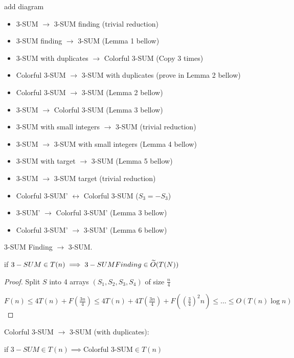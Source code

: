 {\color{red} add diagram}

\begin{itemize}
	\item 3-SUM $\to$ 3-SUM finding (trivial reduction)
	\item 3-SUM finding $\to$ 3-SUM (Lemma 1 bellow)
			
	\item 3-SUM with duplicates $\to$ Colorful 3-SUM (Copy 3 times)
	\item Colorful 3-SUM $\to$ 3-SUM with duplicates (prove in Lemma 2 bellow)

	\item Colorful 3-SUM $\to$ 3-SUM (Lemma 2 bellow)
	\item 3-SUM $\to$ Colorful 3-SUM (Lemma 3 bellow)

	\item 3-SUM with small integers $\to$ 3-SUM (trivial reduction)
	\item 3-SUM $\to$ 3-SUM with small integers (Lemma 4 bellow)

	\item 3-SUM with target $\to$ 3-SUM (Lemma 5 bellow)
	\item 3-SUM $\to$ 3-SUM target (trivial reduction)

	\item Colorful 3-SUM' $\longleftrightarrow$ Colorful 3-SUM ($S_3 = -S_3$)

	\item 3-SUM' $\to$ Colorful 3-SUM' (Lemma 3 bellow)
	\item Colorful 3-SUM' $\to$ 3-SUM' (Lemma 6 bellow)
\end{itemize}

\begin{lm}
	3-SUM Finding $\to$ 3-SUM.

	if $3-SUM \in T(n) \implies 3-SUM Finding \in \widetilde{O}(T(N))$ 
\end{lm}

\begin{proof}
	Split $S $ into 4 arrays $(S_1, S_2, S_3, S_4)$  of size $\frac{n}{4}$ 
	
	$F(n) \le 4 T(n) + F(\frac{3n}{4}) \le 4 T(n) + 4T(\frac{3n}{4}) + F((\frac{3}{4})^2 n) \le \ldots \le O(T(n) \log n)$
\end{proof}

\begin{lm}
	Colorful 3-SUM $\to$ 3-SUM (with duplicates): 

	if $3-SUM \in T(n) \implies \text{Colorful 3-SUM} \in T(n)$ 
\end{lm}

